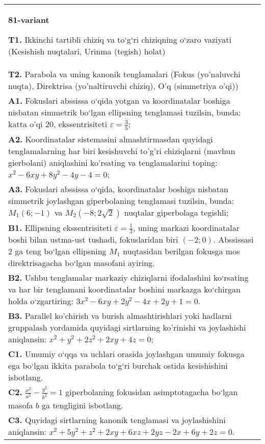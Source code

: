 \documentclass{article}
\begin{document}
\begin{tabular}{m{17cm}}
\textbf{81-variant}
\newline

\textbf{T1.} Ikkinchi tartibli chiziq va to‘g‘ri chiziqning o‘zaro vaziyati (Kesishish nuqtalari, Urinma (tegish) holat) \\
\textbf{T2.} Parabola va uning kanonik tenglamalari (Fokus (yo’naluvchi nuqta), Direktrisa (yo’naltiruvchi chiziq), O’q (simmetriya o’qi)) \\
\textbf{A1.} Fokuslari abssissa o‘qida yotgan va koordinatalar boshiga nisbatan simmetrik bo‘lgan ellipsning tenglamasi tuzilsin, bunda: katta o'qi 20, ekssentrisiteti $\varepsilon=\frac{3}{5}$; \\
\textbf{A2.} Koordinatalar sistemasini almashtirmasdan quyidagi tenglamalarning har biri kesishuvchi to'g'ri chiziqlarni (mavhun gierbolani) aniqlashini ko'rsating va tenglamalarini toping: $x^2-6 x y+8 y^2-4 y-4=0$; \\
\textbf{A3.} Fokuslari abssissa o‘qida, koordinatalar boshiga nisbatan simmetrik joylashgan giperbolaning tenglamasi tuzilsin, bunda: $M_1(6 ;-1)$ va $M_2(-8 ; 2 \sqrt{2})$ nuqtalar giperbolaga tegishli; \\
\textbf{B1.} Ellipsning ekssentrisiteti $\varepsilon=\frac{1}{3}$, uning markazi koordinatalar boshi bilan ustma-ust tushadi, fokuslaridan biri $ (-2; 0) $. Abssissasi 2 ga teng bo‘lgan ellipsning $M_1$ nuqtasidan berilgan fokusga mos direktrisagacha bo‘lgan masofani ayiring. \\
\textbf{B2.} Ushbu tenglamalar markaziy chiziqlarni ifodalashini ko‘rsating va har bir tenglamani koordinatalar boshini markazga ko‘chirgan holda o‘zgartiring: $3x^2-6xy+2y^2-4x+2y+1=0$. \\
\textbf{B3.} Parallel ko'chirish va burish almashtirishlari yoki hadlarni gruppalash yordamida quyidagi sirtlarning ko'rinishi va joylashishi aniqlansin: $x^2+y^2+2 z^2+2 x y+4 z=0$; \\
\textbf{C1.} Umumiy o‘qqa va uchlari orasida joylashgan umumiy fokusga ega bo‘lgan ikkita parabola to‘g‘ri burchak ostida kesishishini isbotlang. \\
\textbf{C2.} $\frac{x^2}{a^2}-\frac{y^2}{b^2}=1$ giperbolaning fokusidan asimptotagacha bo‘lgan masofa $b$ ga tengligini isbotlang. \\
\textbf{C3.} Quyidagi sirtlarning kanonik tenglamasi va joylashishini aniqlansin: $x^2+5 y^2+z^2+2 x y+6 x z+2 y z-2 x+6 y+2 z=0$. \\

\end{tabular}
\vspace{1cm}
\end{document}
